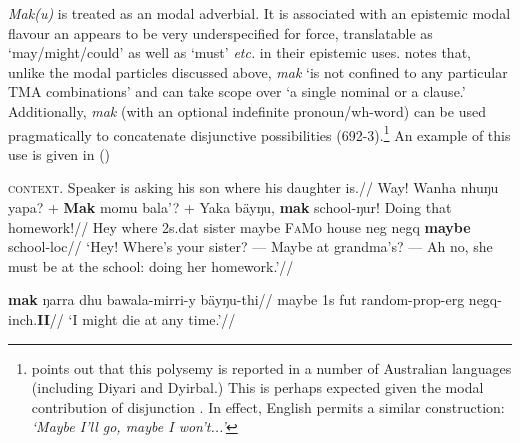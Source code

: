 \textit{Mak(u)} is treated as an modal adverbial. It is associated with an epistemic modal flavour an appears to be very underspecified for force, translatable as `may/might/could' as well as `must' \textit{etc.} in their epistemic uses. \citet[688]{Wilkinson1991} notes that, unlike the modal particles discussed above, \textit{mak} `is not confined to any particular TMA combinations' and can take scope over `a single nominal or a clause.' Additionally, \textit{mak} (with an optional indefinite pronoun/wh-word) can be used pragmatically to concatenate disjunctive possibilities (692-3).\footnote{\citet[692]{Wilkinson1991} points out that this polysemy is reported in a number of Australian languages (including Diyari and Dyirbal.) This is perhaps expected given the modal contribution of disjunction \citet[\textit{e.g.}][]{Roberts1989}. In effect, English permits a similar construction: \textit{`Maybe I'll go, maybe I won't...'}} An example of this use is given in ()



\pex[nopreamble]\a{}\begingl[glhangstyle=none]\glpreamble\textsc{context.} Speaker is asking his son where his daughter is.//
\gla \nogloss{---} Way! Wanha nhuŋu yapa? + \nogloss{---} \textbf{Mak} momu bala'? + \nogloss{---} Yaka bäyŋu, \textbf{mak} school-ŋur! \textnormal{Doing} \textnormal{that} \textnormal{homework}!//
\glb Hey where 2s.\gls{dat} sister maybe \textsc{FaMo} house \gls{neg} \gls{negq} \textbf{maybe} school-\gls{loc}//
\glft`Hey! Where's your sister? --- Maybe at grandma's? --- Ah no, she must be at the school: doing her homework.'\trailingcitation{[AW 20180730]}//

\endgl

\a\begingl\gla \textbf{mak} ŋarra dhu bawala-mirri-y bäyŋu-thi//
\glb maybe 1s \gls{fut} random-\gls{prop}-\gls{erg} \gls{negq}-\gls{inch}.\textbf{II}//
\glft`I might die at any time.'//\endgl

